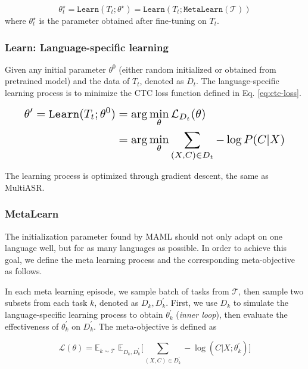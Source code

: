\begin{equation*}
  \theta^{\star}_t = \texttt{Learn}(T_t;\theta^{\star}) = \texttt{Learn}(T_t;\texttt{MetaLearn}(\mathcal{T}))
\end{equation*}
where $\theta^{\star}_t$ is the parameter obtained after fine-tuning on $T_t$.

\subsubsection{Learn: Language-specific learning}
Given any initial parameter $\theta^0$ (either random initialized or obtained from pretrained model) and the data of $T_t$, denoted as $D_t$. The language-specific learning process is to minimize the CTC loss function defined in Eq. \ref{eq:ctc-loss}.

\begin{equation}
  \label{eq:fine-tune}
  \resizebox{0.91\hsize}{!}{$
\begin{aligned}
  \theta^\prime = \texttt{Learn}(T_t;\theta^0) & = \arg \min_\theta \mathcal{L}_{D_t}(\theta) \\
                                 & = \arg \min_\theta \sum_{(X,C) \in D_t} -\log P(C|X)
\end{aligned}
$}
\end{equation}

The learning process is optimized through gradient descent, the same as MultiASR.

\subsubsection{MetaLearn}
The initialization parameter found by MAML should not only adapt on one language well, but for as many languages as possible. In order to achieve this goal, we define the meta learning process and the corresponding meta-objective as follows.

In each meta learning episode, we sample batch of tasks from $\mathcal{T}$, then sample two subsets from each task $k$, denoted as $D_k, D_k^\prime$. First, we use $D_k$ to simulate the language-specific learning process to obtain $\theta^\prime_k$ (\textit{inner loop}), then evaluate the effectiveness of $\theta^\prime_k$ on $D_k^\prime$. The meta-objective is defined as

\begin{equation}
  \label{eq:meta-obj}
  \mathcal{L}(\theta)=\mathbb{E}_{k \sim \mathcal{T}} \; \mathbb{E}_{D_k, D_k^\prime} \Big [\sum_{(X,C) \in D_k^\prime} - \log(C|X; \theta^\prime_k) \Big ]
\end{equation}

